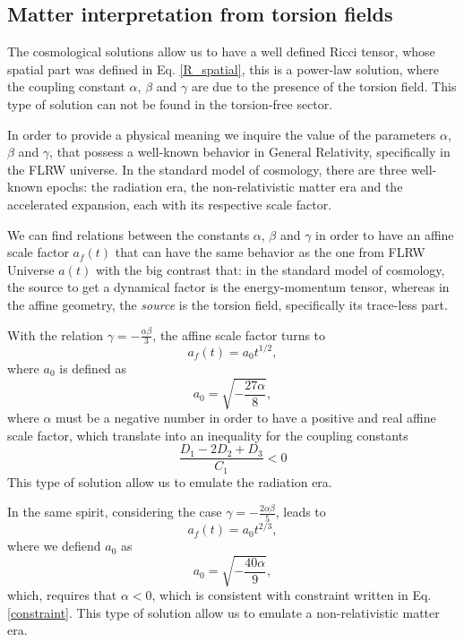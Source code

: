 \subsection{Matter interpretation from torsion fields}

The cosmological solutions allow us to have a well defined Ricci tensor, whose
spatial part was defined in Eq. \eqref{R_spatial}, this is a power-law solution,
where the coupling constant $\alpha$, $\beta$ and $\gamma$ are due to the presence 
of the torsion field. This type of solution can not be found in the torsion-free sector.

In order to provide a physical meaning we inquire the value of the parameters $\alpha$, 
$\beta$ and $\gamma$, that possess a well-known behavior in General Relativity, 
specifically in the FLRW universe. In the standard model of cosmology, there are
three well-known epochs: the radiation era, the non-relativistic matter era and the
accelerated expansion, each with its respective scale factor. 

We can find relations between the constants $\alpha$, $\beta$ and $\gamma$ in order
to have an affine scale factor $a_f(t)$ that can have the same behavior as the one from
FLRW Universe $a(t)$ with the big contrast that: in the standard model of cosmology,
the source to get a dynamical factor is the energy-momentum tensor, whereas in the
affine geometry, the \textit{source} is the torsion field, specifically its trace-less
part.

With the relation $\gamma = -\frac{\alpha\beta}{3}$, the affine scale factor turns to
\begin{equation}
    a_f(t) = a_0 t^{1/2},
\end{equation}
where $a_0$ is defined as 
\begin{equation}
    a_0 = \sqrt{-\frac{27\alpha}{8}},
\end{equation}
where $\alpha$ must be a negative number in order to have 
a positive and real affine scale factor, which translate into an inequality for the coupling constants
\begin{equation}
    \label{constraint}
    \frac{D_1 - 2D_2 + D_3}{C_1} < 0
\end{equation}
This type of solution allow us to emulate the radiation era. 

In the same spirit, considering the case $\gamma = -\frac{2\alpha\beta}{5}$, leads to
\begin{equation}
    a_f(t) = a_{0}t^{2/3},
\end{equation}
where we defiend $a_0$ as 
\begin{equation}
    a_0 = \sqrt{-\frac{40\alpha}{9}},
\end{equation}    
which, requires that $\alpha < 0$, which is consistent with constraint 
written in Eq. \eqref{constraint}. This type of solution allow us to emulate a non-relativistic 
matter era.

